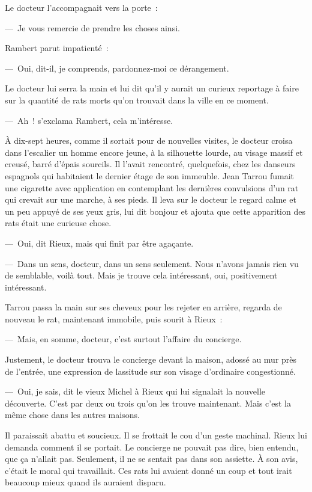 \documentclass[french,twoside]{book} %
\begin{document}
Le docteur l’accompagnait vers la porte :\par
— Je vous remercie de prendre les choses ainsi.\par
Rambert parut impatienté :\par
— Oui, dit-il, je comprends, pardonnez-moi ce dérangement.\par
Le docteur lui serra la main et lui dit qu’il y aurait un curieux reportage à faire sur la quantité de rats morts qu’on trouvait dans la ville en ce moment.\par
— Ah ! s’exclama Rambert, cela m’intéresse.\par
À dix-sept heures, comme il sortait pour de nouvelles visites, le docteur croisa dans l’escalier un homme encore jeune, à la silhouette lourde, au visage massif et creusé, barré d’épais sourcils. Il l’avait rencontré, quelquefois, chez les danseurs espagnols qui habitaient le dernier étage de son immeuble. Jean Tarrou fumait une cigarette avec application en contemplant les dernières convulsions d’un rat qui crevait sur une marche, à ses pieds. Il leva sur le docteur le regard calme et un peu appuyé de ses yeux gris, lui dit bonjour et ajouta que cette apparition des rats était une curieuse chose.\par
— Oui, dit Rieux, mais qui finit par être agaçante.\par
— Dans un sens, docteur, dans un sens seulement. Nous n’avons jamais rien vu de semblable, voilà tout. Mais je trouve cela intéressant, oui, positivement intéressant.\par
Tarrou passa la main sur ses cheveux pour les rejeter en arrière, regarda de nouveau le rat, maintenant immobile, puis sourit à Rieux :\par
— Mais, en somme, docteur, c’est surtout l’affaire du concierge.\par
Justement, le docteur trouva le concierge devant la maison, adossé au mur près de l’entrée, une expression de lassitude sur son visage d’ordinaire congestionné.\par
— Oui, je sais, dit le vieux Michel à Rieux qui lui signalait la nouvelle découverte. C’est par deux ou trois qu’on les trouve maintenant. Mais c’est la même chose dans les autres maisons.\par
Il paraissait abattu et soucieux. Il se frottait le cou d’un geste machinal. Rieux lui demanda comment il se portait. Le concierge ne pouvait pas dire, bien entendu, que ça n’allait pas. Seulement, il ne se sentait pas dans son assiette. À son avis, c’était le moral qui travaillait. Ces rats lui avaient donné un coup et tout irait beaucoup mieux quand ils auraient disparu.\par
\end{document}
